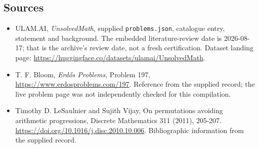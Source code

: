 \documentclass[11pt,a4paper]{article}
\begin{document}
\subsection{Sources}

{\small

\begin{itemize}

\item[\hypertarget{source:statement:1}{S1}] ULAM.AI, \emph{UnsolvedMath}, supplied \texttt{problems.json}, catalogue entry, statement and background. The embedded literature-review date is 2026-08-17; that is the archive’s review date, not a fresh certification. Dataset landing page: \url{https://huggingface.co/datasets/ulamai/UnsolvedMath}.

\item[\hypertarget{source:statement:2}{S2}] T. F. Bloom, \emph{Erdős Problems}, Problem 197, \url{https://www.erdosproblems.com/197}. Reference from the supplied record; the live problem page was not independently checked for this compilation.

\item[\hypertarget{source:statement:3}{S3}] Timothy D. LeSaulnier and Sujith Vijay, On permutations avoiding arithmetic progressions, Discrete Mathematics 311 (2011), 205-207. \url{https://doi.org/10.1016/j.disc.2010.10.006}. Bibliographic information from the supplied record.

\end{itemize}

}

\label{end:statement}
\end{document}
